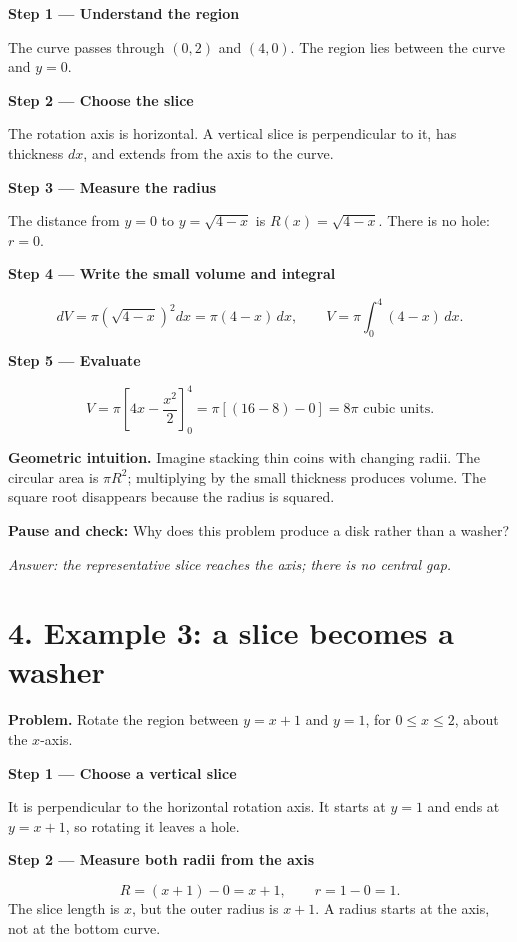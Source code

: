 \documentclass[11pt,letterpaper]{article}
\newcommand{\topic}[1]{\section*{#1}}
\newcommand{\pauseq}[1]{\par\textbf{Pause and check:} #1\par}
\newcommand{\intuition}[1]{\par\textbf{Geometric intuition.} #1\par}
\newcommand{\step}[2]{\par\textbf{Step #1 --- #2}\par}
\begin{document}
\step{1}{Understand the region}
The curve passes through $(0,2)$ and $(4,0)$. The region lies between the curve and $y=0$.
\step{2}{Choose the slice}
The rotation axis is horizontal. A vertical slice is perpendicular to it, has thickness $dx$, and extends from the axis to the curve.
\step{3}{Measure the radius}
The distance from $y=0$ to $y=\sqrt{4-x}$ is $R(x)=\sqrt{4-x}$. There is no hole: $r=0$.
\step{4}{Write the small volume and integral}
\[
dV=\pi\left(\sqrt{4-x}\right)^2dx=\pi(4-x)\,dx,
\qquad V=\pi\int_0^4(4-x)\,dx.
\]
\step{5}{Evaluate}
\[
V=\pi\left[4x-\frac{x^2}{2}\right]_0^4
=\pi[(16-8)-0]=\boxed{8\pi\text{ cubic units}}.
\]
\intuition{Imagine stacking thin coins with changing radii. The circular area is $\pi R^2$; multiplying by the small thickness produces volume. The square root disappears because the radius is squared.}
\pauseq{Why does this problem produce a disk rather than a washer?}
\textit{Answer: the representative slice reaches the axis; there is no central gap.}
\newpage
\topic{4. Example 3: a slice becomes a washer}
\textbf{Problem.} Rotate the region between $y=x+1$ and $y=1$, for $0\leq x\leq2$, about the $x$-axis.
\begin{center}\end{center}
\step{1}{Choose a vertical slice}
It is perpendicular to the horizontal rotation axis. It starts at $y=1$ and ends at $y=x+1$, so rotating it leaves a hole.
\step{2}{Measure both radii from the axis}
\[R=(x+1)-0=x+1,\qquad r=1-0=1.\]
The slice length is $x$, but the outer radius is $x+1$. A radius starts at the axis, not at the bottom curve.
\end{document}
